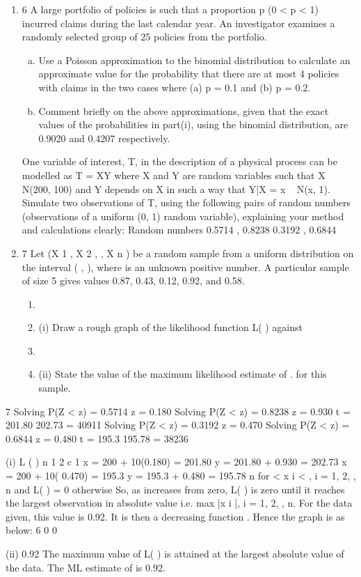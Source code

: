 \documentclass[a4paper,12pt]{article}
\begin{document}
\begin{enumerate}

\item 6
A large portfolio of policies is such that a proportion p (0 < p < 1) incurred claims
during the last calendar year. An investigator examines a randomly selected group of
25 policies from the portfolio.

\begin{enumerate}[(a)]
\item Use a Poisson approximation to the binomial distribution to calculate an approximate value for the probability that there are at most 4 policies with
claims in the two cases where (a) p = 0.1 and (b) p = 0.2.
\item Comment briefly on the above approximations, given that the exact values of
the probabilities in part(i), using the binomial distribution, are 0.9020 and
0.4207 respectively.
\end{enumerate}

One variable of interest, T, in the description of a physical process can be modelled as
T = XY where X and Y are random variables such that X ~ N(200, 100) and Y depends on X in such a way that Y|X = x ~ N(x, 1).
Simulate two observations of T, using the following pairs of random numbers (observations of a uniform (0, 1) random variable), explaining your method and
calculations clearly:
Random numbers
0.5714 , 0.8238
0.3192 , 0.6844

\item 7
Let (X 1 , X 2 , , X n ) be a random sample from a uniform distribution on the interval
( , ), where is an unknown positive number.
A particular sample of size 5 gives values 0.87, 0.43, 0.12, 0.92, and 0.58.
\begin{enumerate}
\item \item (i) Draw a rough graph of the likelihood function L( ) against
\item \item (ii) State the value of the maximum likelihood estimate of . for this sample.
\end{enumerate}
\end{enumerate}




7
Solving P(Z < z) = 0.5714 z = 0.180
Solving P(Z < z) = 0.8238 z = 0.930
t = 201.80 202.73 = 40911
Solving P(Z < z) = 0.3192 z = 0.470
Solving P(Z < z) = 0.6844 z = 0.480
t = 195.3 195.78 = 38236
\item (i)
L ( )
n
1
2
c
1
x = 200 + 10(0.180) = 201.80
y = 201.80 + 0.930 = 202.73
x = 200 + 10( 0.470) = 195.3
y = 195.3 + 0.480 = 195.78
n
for
< x i < , i = 1, 2,
, n and L( ) = 0 otherwise
So, as increases from zero, L( ) is zero until it reaches the largest
observation in absolute value i.e. max |x i |, i = 1, 2, , n. For the data given,
this value is 0.92.
It is then a decreasing function . Hence the graph is as below:
6
0
0
\item (ii)
0.92
The maximum value of L( ) is attained at the largest absolute value of the
data. The ML estimate of is 0.92.
\end{document}
